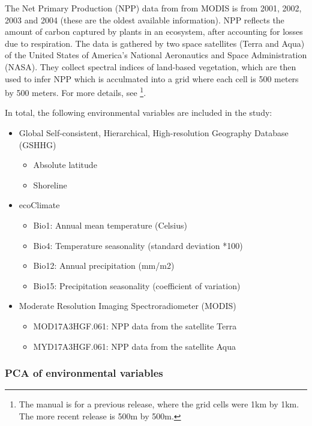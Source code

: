 \documentclass[12pt,letterpaper]{article}
\begin{document}
The Net Primary Production (NPP) data from from MODIS is from 2001, 2002, 2003 and 2004 (these are the oldest available information). NPP reflects the amount of carbon captured by plants in an ecosystem, after accounting for losses due to respiration. The data is gathered by two space satellites (Terra and Aqua) of the United States of America's National Aeronautics and Space Administration (NASA). They collect spectral indices of land-based vegetation, which are then used to infer NPP which is acculmated into a grid where each cell is 500 meters by 500 meters. For more details, see \citet{running2015daily} \footnote{The manual is for a previous release, where the grid cells were 1km by 1km. The more recent release is 500m by 500m.}.

In total, the following environmental variables are included in the study:

\begin{itemize}
\item Global Self-consistent, Hierarchical, High-resolution Geography Database (GSHHG)
\begin{itemize}
    \item Absolute latitude
    \item Shoreline
\end{itemize}
\item ecoClimate
\begin{itemize}
\item Bio1: Annual mean temperature (Celsius)
\item Bio4: Temperature seasonality (standard deviation *100)
\item Bio12: Annual precipitation (mm/m2)
\item Bio15: Precipitation seasonality (coefficient of variation)
\end{itemize}
\item Moderate Resolution Imaging Spectroradiometer (MODIS)
\begin{itemize}
    \item MOD17A3HGF.061: NPP data from the satellite Terra
    \item MYD17A3HGF.061: NPP data from the satellite Aqua
\end{itemize}
\end{itemize}


\FloatBarrier

\newpage
\subsubsection{PCA of environmental variables}
\label{appendix_eniron_PCA}
\end{document}
